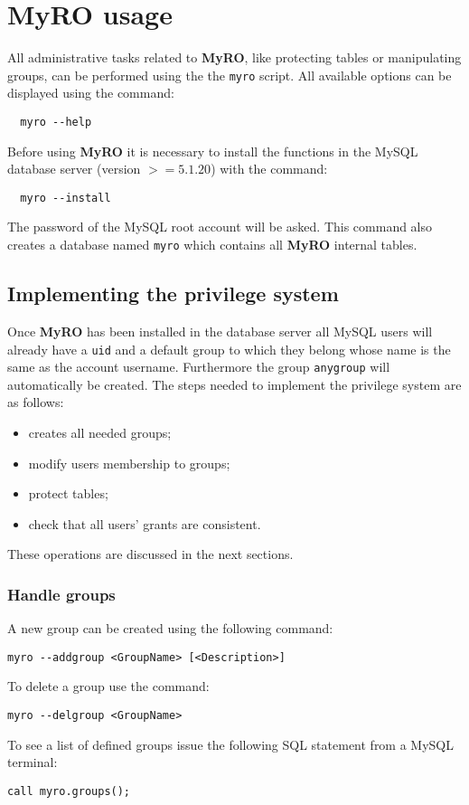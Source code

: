 \documentclass[12pt,titlepage]{article}
\newcommand{\myro}{\textbf{MyRO} }
\newcommand{\myrO}{\textbf{MyRO}}
\begin{document}
\newpage
\section{\myro usage}
All administrative tasks related to \myrO, like protecting tables or
manipulating groups, can be performed using the the \verb|myro|
script. All available options can be displayed using the command:
%
\begin{verbatim}
  myro --help
\end{verbatim}
%
Before using \myro it is necessary to install the functions in the
MySQL database server (version $>= 5.1.20$) with the command:
%
\begin{verbatim}
  myro --install
\end{verbatim}
%
The password of the MySQL root account will be asked. This command
also creates a database named \verb|myro| which contains all \myro
internal tables.

%
\subsection{Implementing the privilege system}
Once \myro has been installed in the database server all MySQL users
will already have a \verb|uid| and a default group to which they
belong whose name is the same as the account username. Furthermore
the group \verb|anygroup| will automatically be created. The steps
needed to implement the privilege system are as follows:
%
\begin{itemize}
\item creates all needed groups;
\item modify users membership to groups;
\item protect tables;
\item check that all users' grants are consistent.
\end{itemize}
%
These operations are discussed in the next sections.

%
\subsubsection{Handle groups}
A new group can be created using the following command:
%
\begin{verbatim}
myro --addgroup <GroupName> [<Description>]
\end{verbatim}
%
To delete a group use the command:
%
\begin{verbatim}
myro --delgroup <GroupName>
\end{verbatim}
%
To see a list of defined groups issue the following SQL statement from
a MySQL terminal:
%
\begin{verbatim}
call myro.groups();
\end{verbatim}
\end{document}
